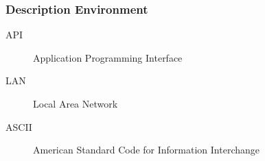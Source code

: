 \label{description}
\begin{frame}\frametitle{Description Environment}
  \begin{description}
    \item[API] Application Programming Interface
    \item[LAN] Local Area Network
    \item[ASCII] American Standard Code for Information Interchange
  \end{description}
\end{frame}
